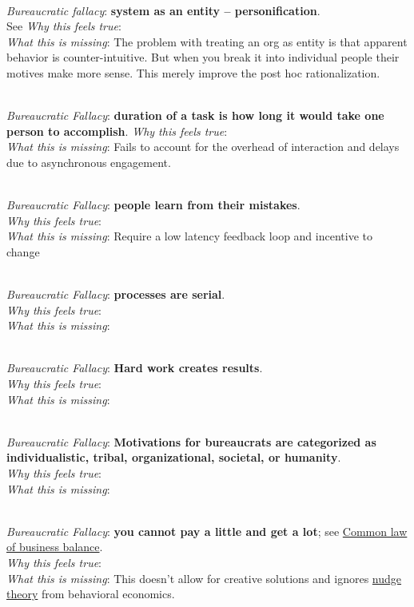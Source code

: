 \ \\

\textit{Bureaucratic fallacy}: \textbf{system as an entity -- personification}. \\
See \cite{2002_Gall}
\textit{Why this feels true}: \\
\textit{What this is missing}: The problem with treating an org as entity is that apparent behavior is counter-intuitive. But when you break it into individual people their motives make more sense. This merely improve the post hoc rationalization. 

\ \\

\textit{Bureaucratic Fallacy}: \textbf{duration of a task is how long it would take one person to accomplish}. 
\textit{Why this feels true}: \\
\textit{What this is missing}: Fails to account for the overhead of interaction and delays due to asynchronous engagement.

\ \\

\textit{Bureaucratic Fallacy}: \textbf{people learn from their mistakes}. \\
\textit{Why this feels true}: \\
\textit{What this is missing}: Require a low latency feedback loop and incentive to change

\ \\

\textit{Bureaucratic Fallacy}: \textbf{processes are serial}.\\
\textit{Why this feels true}: \\
\textit{What this is missing}: 


\ \\

\textit{Bureaucratic Fallacy}: \textbf{Hard work creates results}.\\
\textit{Why this feels true}: \\
\textit{What this is missing}: 


\ \\

\textit{Bureaucratic Fallacy}: \textbf{Motivations for bureaucrats are categorized as individualistic, tribal, organizational, societal, or humanity}.\\
\textit{Why this feels true}: \\
\textit{What this is missing}: 


\ \\

\textit{Bureaucratic Fallacy}: \textbf{you cannot pay a little and get a lot}; see \href{https://en.wikipedia.org/wiki/Common_law_of_business_balance}{Common law of business balance}. \\
\textit{Why this feels true}: \\
\textit{What this is missing}: This doesn't allow for creative solutions and ignores \href{https://en.wikipedia.org/wiki/Nudge_theory}{nudge theory} from behavioral economics. 
